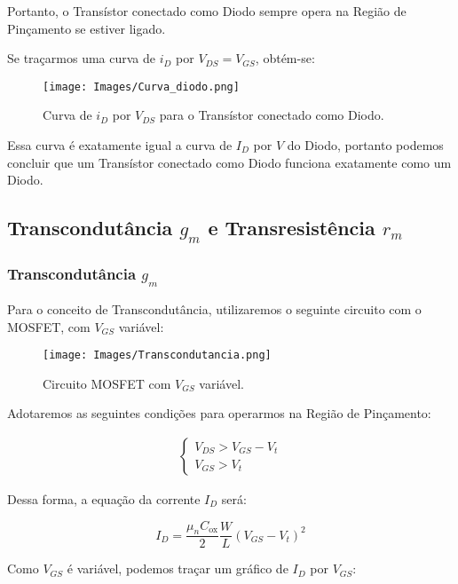 \documentclass[12pt]{article}
\begin{document}
Portanto, o Transístor conectado como Diodo sempre opera na Região de Pinçamento se estiver ligado.

Se traçarmos uma curva de $i_D$ por $V_{DS} = V_{GS}$, obtém-se:

\begin{figure}[H]
  \begin{center}
    \texttt{[image: Images/Curva\_diodo.png]}
  \end{center}
  \caption{Curva de $i_D$ por $V_{DS}$ para o Transístor conectado como Diodo.}
\end{figure}

Essa curva é exatamente igual a curva de $I_D$ por $V$ do Diodo, portanto podemos concluir que um Transístor conectado como Diodo funciona exatamente como um Diodo.

\subsection{Transcondutância $g_m$ e Transresistência $r_m$}

\subsubsection{Transcondutância $g_m$}

Para o conceito de Transcondutância, utilizaremos o seguinte circuito com o MOSFET, com $V_{GS}$ variável:

\begin{figure}[H]
  \begin{center}
    \texttt{[image: Images/Transcondutancia.png]}
  \end{center}
  \caption{Circuito MOSFET com $V_{GS}$ variável.}
\end{figure}

Adotaremos as seguintes condições para operarmos na Região de Pinçamento:

\begin{align*}
  \begin{cases}
    V_{DS} > V_{GS} - V_t \\
    V_{GS} > V_t
  \end{cases}
\end{align*}

Dessa forma, a equação da corrente $I_D$ será:

$$
  I_D = \frac{\mu_n C_{\text{ox}}}{2} \frac{W}{L} (V_{GS}-V_t)^2
$$

Como $V_{GS}$ é variável, podemos traçar um gráfico de $I_D$ por $V_{GS}$:
\end{document}
